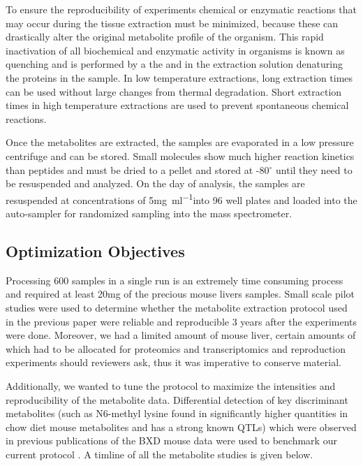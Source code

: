 \documentclass[a4paper,11pt,twoside]{book}
\begin{document}
	To ensure the reproducibility of experiments  chemical or enzymatic reactions that may occur during the tissue extraction must be minimized, because these can drastically alter the original metabolite profile of the organism\citep{Mushtaq2014ExtractionMetabolome}. This rapid inactivation of all biochemical and enzymatic activity in organisms is known as quenching and is performed by a the  and  in the extraction solution denaturing the proteins in the sample. In low temperature extractions, long extraction times can be used without large changes from thermal degradation. Short extraction times in high temperature extractions are used to prevent spontaneous chemical reactions. 
	
	Once the metabolites are extracted, the samples are evaporated in a low pressure centrifuge and can be stored. Small molecules show much higher reaction kinetics than peptides and must be dried to a pellet and stored at -80$^{\circ}$ until they need to be resuspended and analyzed. On the day of analysis, the samples are resuspended at concentrations of 5\si{\milli\gram\per\milli\litre}into 96 well plates and loaded into the auto-sampler for randomized sampling into the mass spectrometer.
	
	\subsection{Optimization Objectives}
	
	Processing 600 samples in a single run is an extremely time consuming process and required at least 20\si{\milli\gram} of the precious mouse livers samples. Small scale pilot studies were used to determine whether the metabolite extraction protocol used in the previous paper\citep{Williams2016SystemsFunction} were reliable and reproducible 3 years after the experiments were done. Moreover, we had a limited amount of mouse liver, certain amounts of which had to be allocated for proteomics and transcriptomics and reproduction experiments should reviewers ask, thus it was imperative to conserve material. 
	
	Additionally, we wanted to tune the protocol to maximize the intensities and reproducibility of the metabolite data. Differential detection of key discriminant metabolites (such as N6-methyl lysine found in significantly higher quantities in chow diet mouse metabolites and has a strong known QTLs) which were observed in previous publications of the BXD mouse data were used to benchmark our current protocol \citep{Williams2016SystemsFunction,Wu2014MultilayeredPopulation}.  A timline of all the metabolite studies is given below.
	
\end{document}
